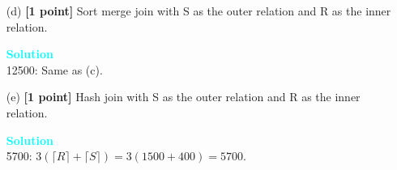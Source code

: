 \documentclass[10pt]{article}
\newenvironment{solution}
    { \begin{mdframed}[backgroundcolor=gray!10] \textcolor{cyan}{\textbf{Solution}} \\}
    {  \end{mdframed}}
\begin{document}
\begin{enumerate}
\begin{itemize}
		            \begin{solution}
			            $\left.\left.\left.2|\mathrm{R}|\left(1+\left\lceil\log _{\mathrm{B}-1} \mid\right\rceil \mathrm{R} \mid / \mathrm{B}\right\rceil\right\rceil\right)+2|\mathrm{~S}|\left(1+\left\lceil\log _{\mathrm{B}-1}|| \mathrm{S} \mid / \mathrm{B}\right\rceil\right\rceil\right)+|\mathrm{R}|+|\mathrm{S}|$\\
			            $=\left.\left.2(1500)\left(1+\log _{24} \lceil{1500 / 25}\right\rceil\right)+2(400)\left(1+\log _{24} \lceil{400 / 25}\right\rceil\right)+1500+400=12500$\\
			            We cannot use the cost model of 3(M+N) because we cannot sort the larger of the two relations in 2 passes.
		            \end{solution}
		      \item[(d)] \textbf{[1 point]} Sort merge join with S as the outer relation and R as the inner relation.
		            \begin{solution}
			            12500: Same as (c).
		            \end{solution}
		      \item[(e)] \textbf{[1 point]} Hash join with S as the outer relation and R as the inner relation.
		            \begin{solution}
			            5700: $3( \lceil R \rceil + \lceil S \rceil ) = 3(1500 + 400) = 5700$.
		            \end{solution}
	      \end{itemize}


\end{enumerate}
\end{document}
